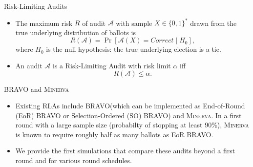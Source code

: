 \documentclass[final]{beamer}
\newcommand{\Minerva}{\textsc{Minerva}\xspace}
\newcommand{\BRAVO}{\textsc{BRAVO}\xspace}
\newlength{\colwidth}
\begin{document}
\begin{frame}[t]
\begin{columns}[t]
\begin{column}{\colwidth}
\begin{block}{Risk-Limiting Audits}
\begin{itemize}

\item
The maximum risk $R$ of audit $\mathcal{A}$ with sample $X\in \{0,1\}^*$ drawn from 
the true underlying distribution of ballots is
$$R(\mathcal{A})=\Pr[\mathcal{A}(X)=Correct \mid H_0],$$ where $H_0$ is the null
hypothesis: the true underlying election is a tie.

\item
An audit $\mathcal{A}$ is a Risk-Limiting Audit with 
risk limit $\alpha$ iff 
$$R(\mathcal{A}) \le \alpha.$$
\end{itemize}
\end{block}
\begin{block}{\BRAVO and \Minerva}
\begin{itemize}
\item Existing RLAs include \BRAVO (which can be implemented as End-of-Round (EoR) \BRAVO or Selection-Ordered (SO) \BRAVO)
and \Minerva. In a first round with a large sample size (probabilty of stopping at least 90\%), \Minerva is known to require roughly
half as many ballots as EoR \BRAVO. 
\item We provide the first simulations that compare these audits beyond a first round and for various
round schedules.
\end{itemize}
\end{block}


\end{column}
\end{columns}
\end{frame}
\end{document}
